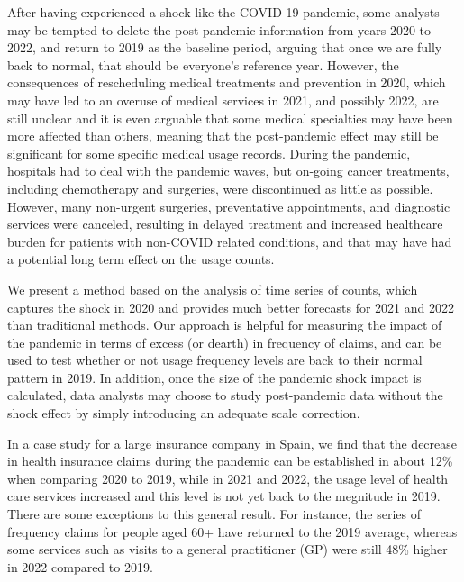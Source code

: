 \documentclass[]{risa}
\begin{document}
After having experienced a shock like the COVID-19 pandemic, some analysts may be tempted to delete the post-pandemic information from years 2020 to 2022, and return to 2019 as the baseline period, arguing that once we are fully back to normal, that should be everyone's reference year. However, the consequences of rescheduling medical treatments and prevention in 2020, which may have led to an overuse of medical services in 2021, and possibly 2022, are still unclear \cite{wilensky2022covid} and it is even arguable that some medical specialties may have been more affected than others, meaning that the post-pandemic effect may still be significant for some specific medical usage records. During the pandemic, hospitals had to deal with the pandemic waves, but on-going cancer treatments, including chemotherapy and surgeries, were discontinued as little as possible. However, many non-urgent surgeries, preventative appointments, and diagnostic services were canceled, resulting in delayed treatment and increased healthcare burden for patients with non-COVID related conditions, and that may have had a potential long term effect on the usage counts.


We present a method based on the analysis of time series of counts, which captures the shock in 2020 and provides much better forecasts for 2021 and 2022 than traditional methods. Our approach is helpful for measuring the impact of the pandemic in terms of excess (or dearth) in frequency of claims, and can be used to test whether or not usage frequency levels are back to their normal pattern in 2019. In addition, once the size of the pandemic shock impact is calculated, data analysts may choose to study post-pandemic data without the shock effect by simply introducing an adequate scale correction.

In a case study for a large insurance company in Spain, we find that the decrease in health insurance claims during the pandemic can be established in about 12\% when comparing 2020 to 2019, while in 2021 and 2022, the usage level of health care services increased and this level is not yet back to the megnitude in 2019. There are some exceptions to this general result. For instance, the series of frequency claims for people aged 60+ have returned to the 2019 average, whereas some services such as visits to a general practitioner (GP) were still 48\% higher in 2022 compared to 2019.
\end{document}
